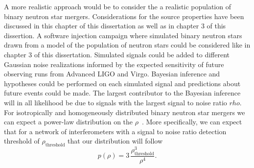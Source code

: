 A more realistic approach would be to consider the a realistic population of binary neutron star mergers. Considerations for the source properties have been discussed in this chapter of this dissertation as well as in chapter $3$ of this dissertion.
A software injection campaign where simulated binary neutron stars drawn from a model of the population of neutron stars could be considered like in chapter $3$ of this dissertation. Simulated signals could be added to different Gaussian noise realizations informed by the expected sensitivity of future observing runs from Advanced LIGO and Virgo. Bayesian inference and hypotheses could be performed on each simulated signal and predictions about future events could be made. The largest contributor to the Bayesian inference will in all likelihood be due to signals with the largest signal to noise ratio $rho$. For isotropically and homogeneously distributed binary neutron star mergers we can expect a power-law distribution on the $\rho$~\cite{schutz2011networks, chen2014loudest}. More specifically, we can expect that for a network of interferometers with a signal to noise ratio detection threshold of $\rho_{\mathrm{threshold}}$ that our distribution will follow
\begin{equation}\label{eqn:universal_snr}
    p(\rho) = 3 \, \frac{\rho_{\mathrm{threshold}}^3}{\rho^4}.
\end{equation}
